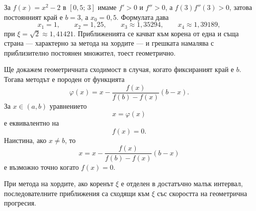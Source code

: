 \begin{lecfigure}[Метод на хордите. Постоянният край е $B=\bigl(b,f(b)\bigr)$, защото $f(b)f''(b)>0$. Всяка хорда свързва $B$ с текущата точка $\bigl(x_n,f(x_n)\bigr)$; абсцисата на пресичането й с $Ox$ е $x_{n+1}$.\label{f:34.1}]
\end{lecfigure}

\begin{example}
За $f(x)=x^2-2$ в $[0{,}5;\,3]$ имаме $f'>0$ и $f''>0$, а $f(3)f''(3)>0$, затова
постоянният край е $b=3$, а $x_0=0{,}5$. Формулата дава
\[
x_1=1,\qquad
x_2=1{,}25,\qquad
x_3\approx1{,}35294,\qquad
x_4\approx1{,}39189,
\]
при $\xi=\sqrt2\approx1{,}41421$. Приближенията се качват към корена от една и
съща страна --- характерно за метода на хордите --- и грешката намалява с
приблизително постоянен множител, тоест геометрично.
\end{example}

Ще докажем геометричната сходимост в случая, когато фиксираният край е $b$. Тогава методът е породен от функцията
\[
\varphi(x)
=
x-\frac{f(x)}{f(b)-f(x)}(b-x).
\]
За $x\in(a,b)$ уравнението
\[
x=\varphi(x)
\]
е еквивалентно на
\[
f(x)=0.
\]
Наистина, ако $x\neq b$, то
\[
x
=
x-\frac{f(x)}{f(b)-f(x)}(b-x)
\]
е възможно точно когато $f(x)=0$.

\begin{prop}
При метода на хордите, ако коренът $\xi$ е отделен в достатъчно малък интервал, последователните приближения са сходящи към $\xi$ със скоростта на геометрична прогресия.
\end{prop}

